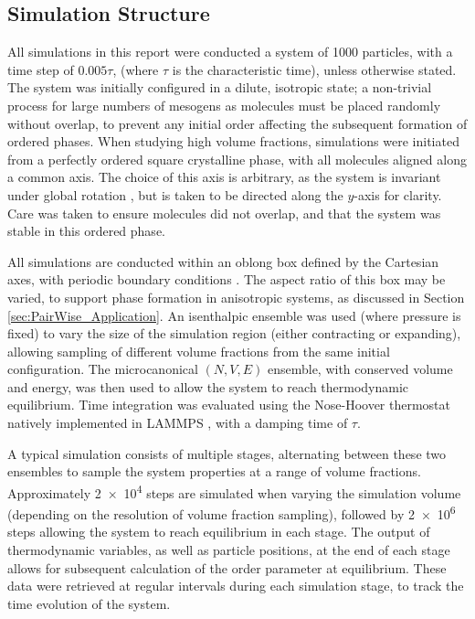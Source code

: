 \documentclass[11pt, a4paper]{article} %
\begin{document}
\subsection{Simulation Structure} %
All simulations in this report were conducted a system of 1000 particles, with a time step of $0.005\tau$, (where $\tau$ is the characteristic time), unless otherwise stated. The system was initially configured in a dilute, isotropic state; a non-trivial process for large numbers of mesogens as molecules must be placed randomly without overlap, to prevent any initial order affecting the subsequent formation of ordered phases. When studying high volume fractions, simulations were initiated from a perfectly ordered square crystalline phase, with all molecules aligned along a common axis. The choice of this axis is arbitrary, as the system is invariant under global rotation \cite{Nos1983}, but is taken to be directed along the $y$-axis for clarity. Care was taken to ensure molecules did not overlap, and that the system was stable in this ordered phase.

All simulations are conducted within an oblong box defined by the Cartesian axes, with periodic boundary conditions \cite{Frenkel2002}. The aspect ratio of this box may be varied, to support phase formation in anisotropic systems, as discussed in Section \ref{sec:PairWise_Application}. An isenthalpic ensemble was used (where pressure is fixed) to vary the size of the simulation region (either contracting or expanding), allowing sampling of different volume fractions from the same initial configuration. The microcanonical $(N,V,E)$ ensemble, with conserved volume and energy, was then used to allow the system to reach thermodynamic equilibrium. Time integration was evaluated using the Nose-Hoover thermostat \cite{Nos1984, Hoover1985} natively implemented in LAMMPS \cite{Shinoda2004}, with a damping time of $\tau$.

A typical simulation consists of multiple stages, alternating between these two ensembles to sample the system properties at a range of volume fractions. Approximately \num{2e4} steps are simulated when varying the simulation volume (depending on the resolution of volume fraction sampling), followed by \num{2e6} steps allowing the system to reach equilibrium in each stage. The output of thermodynamic variables, as well as particle positions, at the end of each stage allows for subsequent calculation of the order parameter at equilibrium. These data were retrieved at regular intervals during each simulation stage, to track the time evolution of the system.
\end{document}
